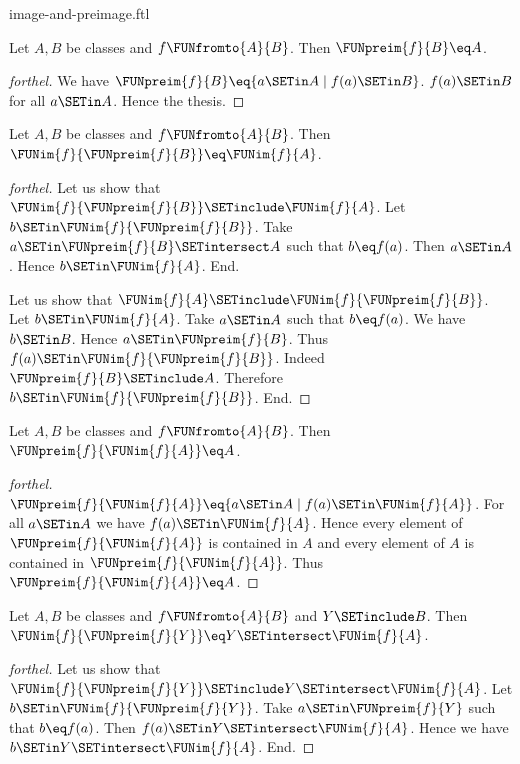 \documentclass{naproche-library}
\begin{document}
\begin{smodule}[title=Computation Laws for Images and Preimages]{image-and-preimage.ftl}
\begin{proposition}[forthel,id=FOUNDATIONS_07_6541963008409600]
  Let $A, B$ be classes and $f \FUNfromto{A}{B}$.
  Then $\FUNpreim{f}{B} \eq A$.
\end{proposition}
\begin{proof}[forthel]
  We have $\FUNpreim{f}{B} \eq \{ a \SETin A \mid f(a) \SETin B \}$.
  $f(a) \SETin B$ for all $a \SETin A$.
  Hence the thesis.
\end{proof}

\begin{proposition}[forthel,id=FOUNDATIONS_07_1913313581596672]
  Let $A, B$ be classes and $f \FUNfromto{A}{B}$.
  Then $\FUNim{f}{\FUNpreim{f}{B}} \eq \FUNim{f}{A}$.
\end{proposition}
\begin{proof}[forthel]
  Let us show that $\FUNim{f}{\FUNpreim{f}{B}} \SETinclude \FUNim{f}{A}$.
    Let $b \SETin \FUNim{f}{\FUNpreim{f}{B}}$.
    Take $a \SETin \FUNpreim{f}{B} \SETintersect A$ such that $b \eq f(a)$.
    Then $a \SETin A$.
    Hence $b \SETin \FUNim{f}{A}$.
  End.

  Let us show that $\FUNim{f}{A} \SETinclude \FUNim{f}{\FUNpreim{f}{B}}$.
    Let $b \SETin \FUNim{f}{A}$.
    Take $a \SETin A$ such that $b \eq f(a)$.
    We have $b \SETin B$.
    Hence $a \SETin \FUNpreim{f}{B}$.
    Thus $f(a) \SETin \FUNim{f}{\FUNpreim{f}{B}}$.
    Indeed $\FUNpreim{f}{B} \SETinclude A$.
    Therefore $b \SETin \FUNim{f}{\FUNpreim{f}{B}}$.
  End.
\end{proof}

\begin{proposition}[forthel,id=FOUNDATIONS_07_3819758101200896]
  Let $A, B$ be classes and $f \FUNfromto{A}{B}$.
  Then $\FUNpreim{f}{\FUNim{f}{A}} \eq A$.
\end{proposition}
\begin{proof}[forthel]
  $\FUNpreim{f}{\FUNim{f}{A}} \eq \{ a \SETin A \mid f(a) \SETin \FUNim{f}{A} \}$.
  For all $a \SETin A$ we have $f(a) \SETin \FUNim{f}{A}$.
  Hence every element of $\FUNpreim{f}{\FUNim{f}{A}}$ is contained in $A$ and every element of $A$ is contained in $\FUNpreim{f}{\FUNim{f}{A}}$.
  Thus $\FUNpreim{f}{\FUNim{f}{A}} \eq A$.
\end{proof}

\begin{proposition}[forthel,id=FOUNDATIONS_07_7760514696347648]
  Let $A, B$ be classes and $f \FUNfromto{A}{B}$ and $Y \SETinclude B$.
  Then $\FUNim{f}{\FUNpreim{f}{Y}} \eq Y \SETintersect \FUNim{f}{A}$.
\end{proposition}
\begin{proof}[forthel]
  Let us show that $\FUNim{f}{\FUNpreim{f}{Y}} \SETinclude Y \SETintersect \FUNim{f}{A}$.
    Let $b \SETin \FUNim{f}{\FUNpreim{f}{Y}}$.
    Take $a \SETin \FUNpreim{f}{Y}$ such that $b \eq f(a)$.
    Then $f(a) \SETin Y \SETintersect \FUNim{f}{A}$.
    Hence we have $b \SETin Y \SETintersect \FUNim{f}{A}$.
  End.


\end{proof}
\end{smodule}
\end{document}
